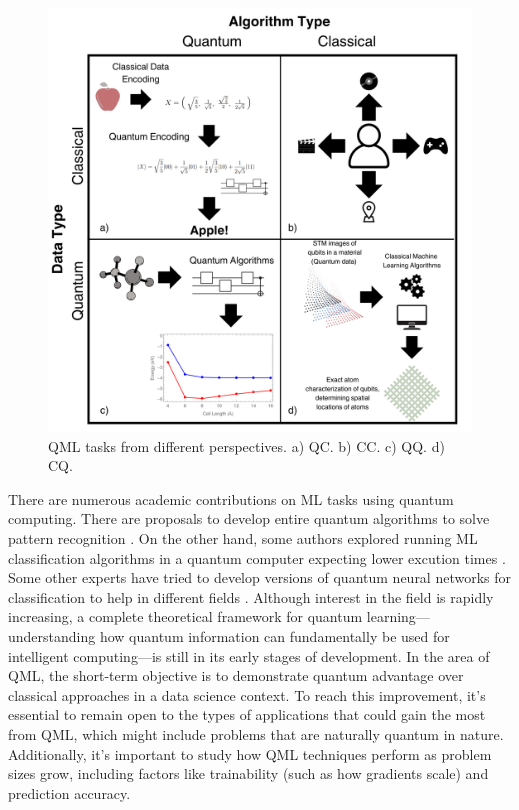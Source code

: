 \documentclass{article}
\begin{document}
\begin{figure}[ht]
    \centering
    \includegraphics[scale=0.17]{figures/QMLtypes.png}
    \caption{QML tasks from different perspectives. a) QC. b) CC. c) QQ. d) CQ. }
    \label{fig:qtasks}
\end{figure}

There are numerous academic contributions on ML tasks using quantum computing. There are proposals to develop entire quantum algorithms to solve pattern recognition \cite{Andrecut1998, Schtzhold2003}.
On the other hand, some authors explored running ML classification algorithms in a quantum computer expecting lower excution times \cite{Wiebe2014, Rebentrost2014}. Some other experts have tried to develop 
versions of quantum neural networks for classification to help in different fields \cite{G2007, SchuldMaria2014, farhi2018classificationquantumneuralnetworks, Mathur2021, Sebastianelli2022, Liu2024}.
Although interest in the field is rapidly increasing, a complete theoretical framework for quantum learning—understanding how quantum information can fundamentally be used for intelligent computing—is still in its 
early stages of development. In the area of QML, the short-term objective is to demonstrate quantum advantage over classical approaches in a data science context. 
To reach this improvement, it's essential to remain open to the types of applications that could gain the most from QML, which might include problems that are naturally quantum in nature. 
Additionally, it's important to study how QML techniques perform as problem sizes grow, including factors like trainability (such as how gradients scale) and prediction accuracy.
\end{document}

